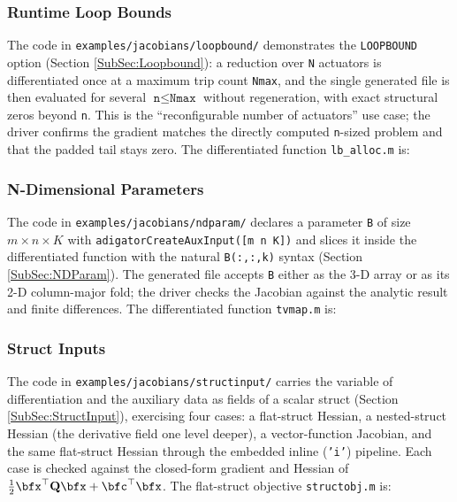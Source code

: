 \documentclass[10pt,pdftex]{article}
\begin{document}
\subsubsection{Runtime Loop Bounds}
The code in \texttt{examples/jacobians/loopbound/} demonstrates the \texttt{LOOPBOUND} option (Section \ref{SubSec:Loopbound}): a reduction over \texttt{N} actuators is differentiated once at a maximum trip count \texttt{Nmax}, and the single generated file is then evaluated for several $\texttt{n} \le \texttt{Nmax}$ without regeneration, with exact structural zeros beyond \texttt{n}. This is the ``reconfigurable number of actuators'' use case; the driver confirms the gradient matches the directly computed \texttt{n}-sized problem and that the padded tail stays zero. The differentiated function \texttt{lb\_alloc.m} is:


\subsubsection{N-Dimensional Parameters}
The code in \texttt{examples/jacobians/ndparam/} declares a parameter \texttt{B} of size $m\times n\times K$ with \texttt{adigatorCreateAuxInput([m n K])} and slices it inside the differentiated function with the natural \texttt{B(:,:,k)} syntax (Section \ref{SubSec:NDParam}). The generated file accepts \texttt{B} either as the 3-D array or as its 2-D column-major fold; the driver checks the Jacobian against the analytic result and finite differences. The differentiated function \texttt{tvmap.m} is:


\subsubsection{Struct Inputs}
The code in \texttt{examples/jacobians/structinput/} carries the variable of differentiation and the auxiliary data as fields of a scalar struct (Section \ref{SubSec:StructInput}), exercising four cases: a flat-struct Hessian, a nested-struct Hessian (the derivative field one level deeper), a vector-function Jacobian, and the same flat-struct Hessian through the embedded inline (\texttt{'i'}) pipeline. Each case is checked against the closed-form gradient and Hessian of $\tfrac12\bfx^\top \mathbf{Q}\bfx + \bfc^\top\bfx$. The flat-struct objective \texttt{structobj.m} is:

\end{document}
